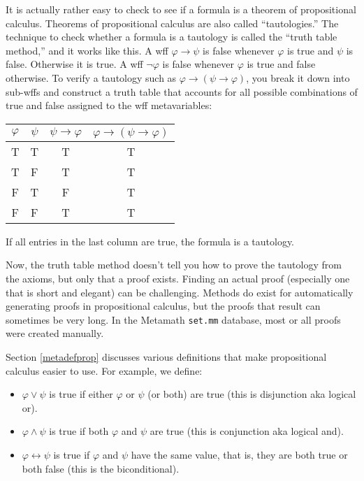 It is actually rather easy to check to see if a formula is a theorem of
propositional calculus.  Theorems of propositional calculus are also called
``tautologies.''  The technique to check whether a formula is
a tautology is called the ``truth table method,'' and it
works like this.  A wff $\varphi\rightarrow\psi$ is false whenever $\varphi$ is true
and $\psi$ is false.  Otherwise it is true.  A wff $\lnot\varphi$ is false
whenever $\varphi$ is true and false otherwise. To verify a tautology such as
$\varphi\rightarrow(\psi\rightarrow \varphi)$, you break it down into sub-wffs and
construct a truth table that accounts for all possible combinations of true
and false assigned to the wff metavariables:
\begin{center}\begin{tabular}{|c|c|c|c|}\hline
\mbox{$\varphi$} & \mbox{$\psi$} & \mbox{$\psi\rightarrow\varphi$}
    & \mbox{$\varphi\rightarrow(\psi\rightarrow \varphi)$} \\ \hline \hline
              T   &  T    &      T       &        T    \\ \hline
              T   &  F    &      T       &        T    \\ \hline
              F   &  T    &      F       &        T    \\ \hline
              F   &  F    &      T       &        T    \\ \hline
\end{tabular}\end{center}
If all entries in the last column are true, the formula is a tautology.

Now, the truth table method doesn't tell you how to prove the tautology from
the axioms, but only that a proof exists.  Finding an actual proof (especially
one that is short and elegant) can be challenging.  Methods do exist for
automatically generating proofs in propositional calculus, but the proofs that
result can sometimes be very long.  In the Metamath \texttt{set.mm} database, most
or all proofs were created manually.

Section \ref{metadefprop} discusses various definitions
that make propositional calculus easier to use.
For example, we define:

\begin{itemize}
\item $\varphi \vee \psi$
  is true if either $\varphi$ or $\psi$ (or both) are true
  (this is disjunction
  aka logical {\sc or}).

\item $\varphi \wedge \psi$
  is true if both $\varphi$ and $\psi$ are true
  (this is conjunction
  aka logical {\sc and}).

\item $\varphi \leftrightarrow \psi$
  is true if $\varphi$ and $\psi$ have the same value, that is,
  they are both true or both false
  (this is the biconditional).
\end{itemize}

